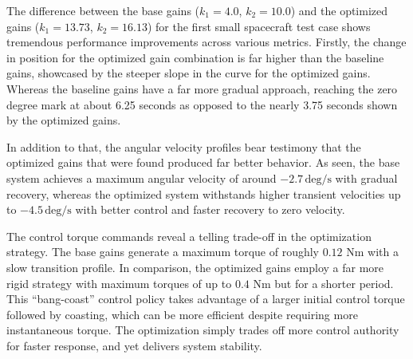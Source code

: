 \documentclass{ifacconf}
\begin{document}
The difference between the base gains ($k_1 = 4.0$, $k_2 = 10.0$) and the optimized gains ($k_1 = 13.73$, $k_2 = 16.13$) for the first small spacecraft test case shows tremendous performance improvements across various metrics. Firstly, the change in position for the optimized gain combination is far higher than the baseline gains, showcased by the steeper slope in the curve for the optimized gains. Whereas the baseline gains have a far more gradual approach, reaching the zero degree mark at about 6.25 seconds as opposed to the nearly 3.75 seconds shown by the optimized gains. 

In addition to that, the angular velocity profiles bear testimony that the optimized gains that were found produced far better behavior. As seen, the base system achieves a maximum angular velocity of around $-2.7\,\text{deg/s}$ with gradual recovery, whereas the optimized system withstands higher transient velocities up to $-4.5\,\text{deg/s}$ with better control and faster recovery to zero velocity.


The control torque commands reveal a telling trade-off in the optimization strategy. The base gains generate a maximum torque of roughly $0.12$ Nm with a slow transition profile. In comparison, the optimized gains employ a far more rigid strategy with maximum torques of up to $0.4$ Nm but for a shorter period. This ``bang-coast'' control policy takes advantage of a larger initial control torque followed by coasting, which can be more efficient despite requiring more instantaneous torque. The optimization simply trades off more control authority for faster response, and yet delivers system stability.
\end{document}
